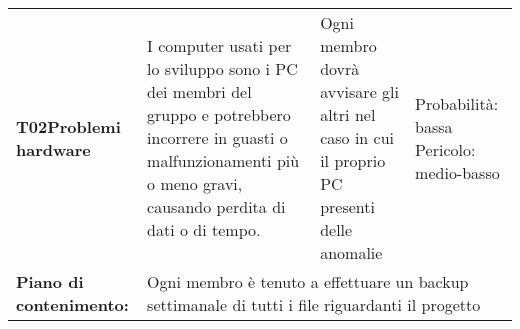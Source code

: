 \begin{longtable}{>{\bfseries}p{2.5cm} p{4.5cm} p{4.5cm} p{2.5cm}}
		\hline
		T02\newline Problemi hardware
		& I computer usati per lo sviluppo sono i PC dei membri del gruppo e potrebbero incorrere in guasti o malfunzionamenti più o meno gravi, causando perdita di dati o di tempo. 
		& Ogni membro dovrà avvisare gli altri nel caso in cui il proprio PC presenti delle anomalie
		& Probabilità: bassa \newline Pericolo: medio-basso \\
		\rowcolor{LightGray}
		Piano di contenimento: 
		& \multicolumn{3}{p{12.5cm}}{Ogni membro è tenuto a effettuare un backup settimanale di tutti i file riguardanti il progetto}\\[0.5cm]
\end{longtable}